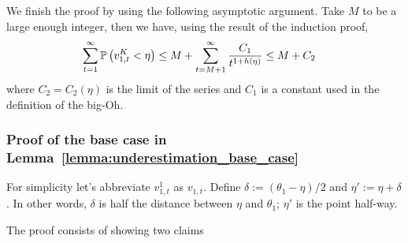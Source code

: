 \begin{myproof}[Proof.]
	We finish the proof by using the following asymptotic argument. Take $M$ to be a large enough integer, then we have, using the result of the induction proof,
	\begin{align*}
	\sum_{t=1}^\infty \P{v^K_{1,t} < \eta} & \le M +  \sum_{t=M+1}^\infty \frac{C_1}{t^{1 + h(\eta)}} \le M +  C_2
	\end{align*}
	where $C_2 = C_2(\eta)$ is the limit of the series and $C_1$ is a constant used in the definition of the big-Oh.
\end{myproof}
\subsubsection{Proof of the base case in Lemma~\ref{lemma:underestimation_base_case}}
\begin{myproof}[Proof.]
	For simplicity let's abbreviate $v^1_{1,t}$ as $v_{1,t}$. Define $\delta := (\theta_1 - \eta)/2$ and  $\eta' :=  \eta + \delta$. In other words, $\delta$ is half the distance between $\eta$ and $\theta_1$; $\eta'$ is the point half-way.
	
	The proof consists of showing two claims

\end{myproof}
